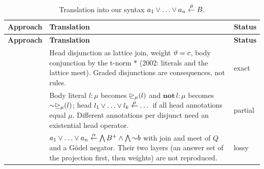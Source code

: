 {        \begin{longtable}{@{}p{}p{}p{}@{}}
            \caption{Translation into our syntax $a_1\flpor\dots\flpor a_n\flpif{\flpweight}B$.}\label{tab:syntax-translation}                                                                                                                                                                                                                                                                                             \\
            \toprule
            \textbf{Approach}                                                                               & \textbf{Translation}                                                                                                                                                                                                                                                & \textbf{Status}                        \\
            \midrule\endfirsthead
            \toprule
            \textbf{Approach}                                                                               & \textbf{Translation}                                                                                                                                                                                                                                                & \textbf{Status}                        \\
            \midrule\endhead
            \bottomrule\endfoot
            \cite{Guller2004procedural,Guller02}                                                            & Head disjunction as lattice join, weight $\vartheta=c$, body conjunction by the t-norm $\ast$ (2002: literals and the lattice meet). Graded disjunctions are consequences, not rules.                                                                              & exact                                  \\
            \cite{Saad2010disjunctive}                                                                      & Body literal $l:\mu$ becomes $\mathord{\trianglerighteq_{\mu}}(l)$ and $\mathbf{not}\,l:\mu$ becomes $\mathord{\sim}\mathord{\trianglerighteq_{\mu}}(l)$; head $l_1\flpor\dots\flpor l_k\flpif{\mu}\dots$ if all head annotations equal $\mu$. Different annotations per disjunct need an existential head operator. & partial                                \\
            \cite{NievesOC07,NievesOC13}                                                                    & $a_1\flpor\dots\flpor a_n\flpif{\alpha}\bigwedge B^+\land\bigwedge\flpnot b$ with join and meet of $Q$ and a Gödel negator. Their two layers (an answer set of the projection first, then weights) are not reproduced.                                              & lossy                                  \\

\end{longtable}}

